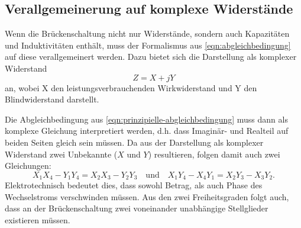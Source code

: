 \subsection{Verallgemeinerung auf komplexe Widerstände}
\label{sec:komplexe-widerstände}
Wenn die Brückenschaltung nicht nur Widerstände, sondern auch Kapazitäten und Induktivitäten
enthält, muss der Formalismus aus \autoref{eqn:abgleichbedingung} auf diese verallgemeinert
werden. Dazu bietet sich die Darstellung als komplexer Widerstand
\begin{equation}
	Z = X + jY
	\label{eqn:komplexer-widerstand}
\end{equation}
an, wobei X den leistungsverbrauchenden Wirkwiderstand und Y den Blindwiderstand darstellt.

Die Abgleichbedingung aus \autoref{eqn:prinzipielle-abgleichbedingung} muss dann als komplexe
Gleichung interpretiert werden, d.h. dass Imaginär- und Realteil auf beiden Seiten gleich sein
müssen. Da aus der Darstellung als komplexer Widerstand zwei Unbekannte ($X$ und $Y$) resultieren,
folgen damit auch zwei Gleichungen:
\begin{equation}
	X_1X_4 - Y_1Y_4 = X_2X_3 - Y_2Y_3 
	\quad \text{und} \quad
	X_1Y_4 - X_4Y_1 = X_2Y_3 - X_3Y_2.
	\label{eqn:komplexe-abgleichbedingung}
\end{equation}
Elektrotechnisch bedeutet dies, dass sowohl Betrag, als auch Phase des Wechselstroms verschwinden
müssen. Aus den zwei Freiheitsgraden folgt auch, dass an der Brückenschaltung zwei voneinander
unabhängige Stellglieder existieren müssen.

\cite{sample}
